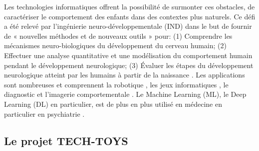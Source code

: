 \documentclass[5pt]{article}
\begin{document}
\par Les technologies informatiques offrent la possibilité de surmonter ces obstacles, de caractériser le comportement des enfants dans des contextes plus naturels. Ce défi a été relevé par l'ingénierie neuro-développementale (IND)
\cite{campolo_novel_2008,campolo_neuro-developmental_2010} dans le but de fournir de « nouvelles méthodes et de nouveaux outils » pour: (1) Comprendre les mécanismes neuro-biologiques du développement du cerveau humain; (2) Effectuer une analyse quantitative et une modélisation du comportement humain pendant le développement neurologique; (3) Évaluer les étapes du développement neurologique atteint par les humains à partir de la naissance \cite{campolo_neuro-developmental_2010}.
Les applications sont nombreuses et comprennent la robotique \cite{scassellati_improving_2018,jouaiti_robot-based_2019}, les jeux informatiques \cite{grossard_serious_2017}, le diagnostic \cite{bangerter_autism_2017,hashemi_computer_2014} et l'imagerie comportementale \cite{torres_characterization_2016,anzalone_how_2014,anzalone_quantifying_2019}. Le Machine Learning (ML), le Deep Learning (DL) \cite{zemouri_deep_2019,mahmud_deep_2021} en particulier, est de plus en plus utilisé en médecine \cite{triantafyllidis_applications_2019,mahmud_deep_2021} en particulier en psychiatrie \cite{koppe_deep_2021}.

\subsection{Le projet TECH-TOYS}
\end{document}
